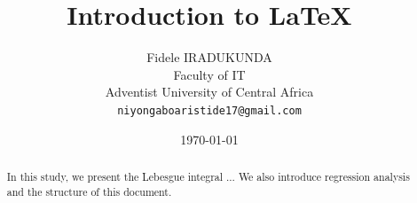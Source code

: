 \documentclass[12pt]{article}	%
\title{Introduction to LaTeX}	%
\author{	%
	Fidele IRADUKUNDA\\	%
	Faculty of IT\\	%
	Adventist University of Central Africa\\	%
	\texttt{niyongaboaristide17@gmail.com}	%
}
\date{\today}	%
\begin{document}
	\maketitle	%
	\newpage	%

	\tableofcontents	%
	\newpage	%

	\begin{abstract}	%
		In this study, we present the Lebesgue integral ...
		We also introduce regression analysis and the structure
		of this document.
	\end{abstract}	%
	\newpage	%
\end{document}
